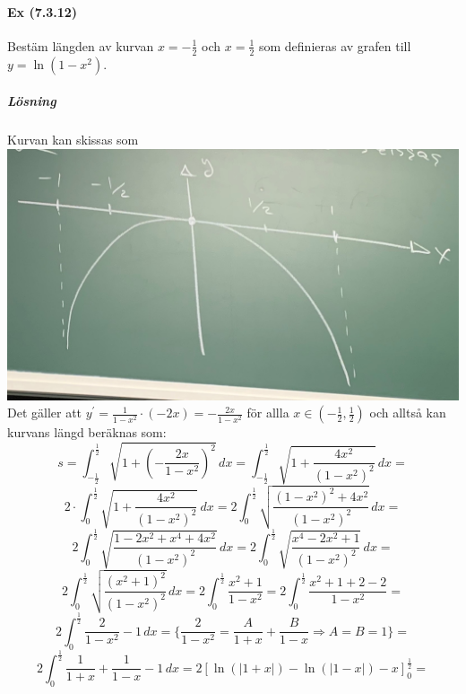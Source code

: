 \paragraph*{Ex (7.3.12)} Bestäm längden av kurvan $x=-\frac{1}{2}$ och $x=\frac{1}{2}$ som definieras av grafen till $y=\ln(1-x^2)$.
\subparagraph{Lösning}
Kurvan kan skissas som\\
\includegraphics[scale=0.1]{lessons/lesson19/imgs/img11.jpg}
Det gäller att $y^\prime=\frac{1}{1-x^2}\cdot(-2x)=-\frac{2x}{1-x^2}$ för allla $x\in(-\frac{1}{2},\frac{1}{2})$ och alltså kan kurvans längd beräknas som:
\begin{equation*}
    s=\int_{-\frac{1}{2}}^\frac{1}{2}\sqrt{1+(-\frac{2x}{1-x^2})^2}\, dx=
    \int_{-\frac{1}{2}}^\frac{1}{2}\sqrt{1+\frac{4x^2}{(1-x^2)^2}}\, dx=
\end{equation*}
\begin{equation*}
    2\cdot\int_0^\frac{1}{2}\sqrt{1+\frac{4x^2}{(1-x^2)^2}}\, dx=
    2\int_0^\frac{1}{2}\sqrt{\frac{(1-x^2)^2+4x^2}{(1-x^2)^2}}\, dx=
\end{equation*}
\begin{equation*}
    2\int_0^\frac{1}{2}\sqrt{\frac{1-2x^2+x^4+4x^2}{(1-x^2)^2}}\, dx=
    2\int_0^\frac{1}{2}\sqrt{\frac{x^4-2x^2+1}{(1-x^2)^2}}\, dx=
\end{equation*}
\begin{equation*}
    2\int_0^\frac{1}{2}\sqrt{\frac{(x^2+1)^2}{(1-x^2)^2}}\, dx=
    2\int_0^\frac{1}{2}\frac{x^2+1}{1-x^2}=
    2\int_0^\frac{1}{2}\frac{x^2+1+2-2}{1-x^2}=
\end{equation*}
\begin{equation*}
    2\int_0^\frac{1}{2}\frac{2}{1-x^2}-1\, dx=
    \{\frac{2}{1-x^2}=\frac{A}{1+x}+\frac{B}{1-x}\Rightarrow A=B=1\}=
\end{equation*}
\begin{equation*}
    2\int_0^\frac{1}{2}\frac{1}{1+x}+\frac{1}{1-x}-1\, dx=
    2[\ln(|1+x|)-\ln(|1-x|)-x]_0^\frac{1}{2}=
\end{equation*}
